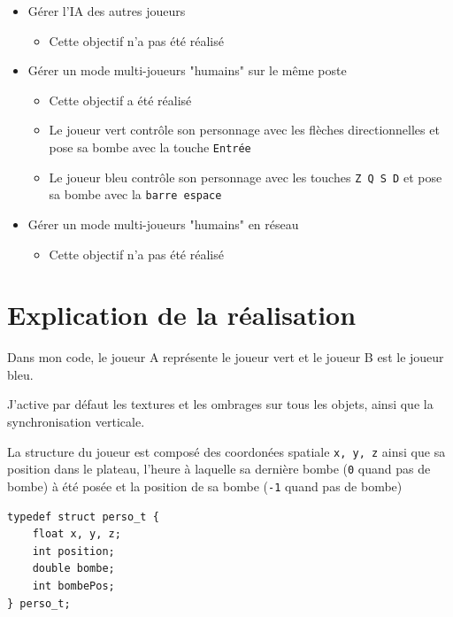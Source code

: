 \documentclass{article}
\begin{document}
\begin{itemize}
        \item Gérer l’IA des autres joueurs
        \begin{itemize}
            \item Cette objectif n'a pas été réalisé
        \end{itemize}

        \item Gérer un mode multi-joueurs "humains" sur le même poste
        \begin{itemize}
            \item Cette objectif a été réalisé
            \item Le joueur vert contrôle son personnage avec les flèches directionnelles et pose sa bombe avec la touche \texttt{Entrée}
            \item Le joueur bleu contrôle son personnage avec les touches \texttt{Z Q S D} et pose sa bombe avec la \texttt{barre espace}
        \end{itemize}

        \item Gérer un mode multi-joueurs "humains" en réseau
        \begin{itemize}
            \item Cette objectif n'a pas été réalisé
        \end{itemize}
    \end{itemize}

    \section[Explication]{Explication de la réalisation}
    Dans mon code, le joueur A représente le joueur vert et le joueur B est le joueur bleu.
    \vspace{10pt}

    J'active par défaut les textures et les ombrages sur tous les objets, ainsi que la synchronisation verticale.
    \vspace{10pt}

    La structure du joueur est composé des coordonées spatiale \texttt{x, y, z} ainsi que sa position dans le plateau, l'heure à laquelle sa dernière bombe (\texttt{0} quand pas de bombe) à été posée et la position de sa bombe (\texttt{-1} quand pas de bombe)
    \begin{center}\begin{minipage}{0.5\textwidth}
        \begin{verbatim}
typedef struct perso_t {
    float x, y, z;
    int position;
    double bombe;
    int bombePos;
} perso_t;
        \end{verbatim}
    \end{minipage}\end{center}
    \vspace{10pt}
\end{document}
